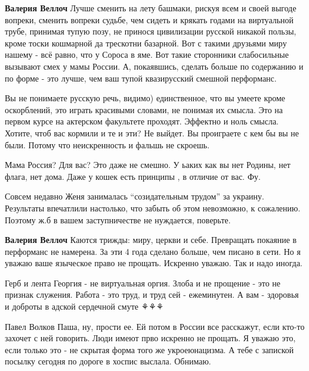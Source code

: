 \begin{itemize}
\begin{itemize}
\textbf{Валерия Веллоч} Лучше сменить на лету башмаки, рискуя всем и своей выгоде
вопреки, сменить вопреки судьбе, чем сидеть и крякать годами на виртуальной
трубе, принимая тупую позу, не принося цивилизации русской никакой пользы,
кроме тоски кошмарной да трескотни базарной. Вот с такими друзьями миру нашему
- всё равно, что у Сороса в яме. Вот такие сторонники слабосильные вызывают
смех у мамы России. А, покаявшись, сделать больше по содержанию и по форме -
это лучше, чем ваш тупой квазирусский смешной перформанс.


Вы не понимаете русскую речь, видимо) единственное, что вы умеете кроме
оскорблений, это играть красивыми словами, не понимая их смысла. Это на первом
курсе на актерском факультете проходят. Эффектно и ноль смысла. Хотите, чтоб
вас кормили и те и эти? Не выйдет. Вы проиграете с кем бы вы не были. Потому
что неискренность и фальшь не скроешь.


Мама Россия? Для вас? Это даже не смешно. У ьаких как вы нет Родины, нет флага,
нет дома. Даже у кошек есть принципы , в отличие от вас. Фу.


Совсем недавно Женя занималась \enquote{созидательным трудом} за украину. Результаты
впечатлили настолько, что забыть об этом невозможно, к сожалению. Поэтому ж.б в
вашем заступничестве не нуждается, поверьте.


\textbf{Валерия Веллоч} Каются трижды: миру, церкви и себе. Превращать покаяние
в перформанс не намерена. За эти 4 года сделано больше, чем писано в сети. Но я
уважаю ваше языческое право не прощать. Искренно уважаю. Так и надо иногда.


Герб и лента Георгия - не виртуальная оргия. Злоба и не прощение - это не
признак служения. Работа - это труд, и труд сей - ежеминутен. А вам - здоровья
и доброты в адской сердечной смуте ⚘⚘⚘


Павел Волков Паша, ну, прости ее. Ей потом в России все расскажут, если кто-то
захочет с ней говорить. Люди имеют прво искренно не прощать. Я уважаю это, если
только это - не скрытая форма того же укроеюнацизма. А тебе с запиской посылку
сегодня по дороге в хоспис выслала. Обнимаю.


\end{itemize}
\end{itemize}
